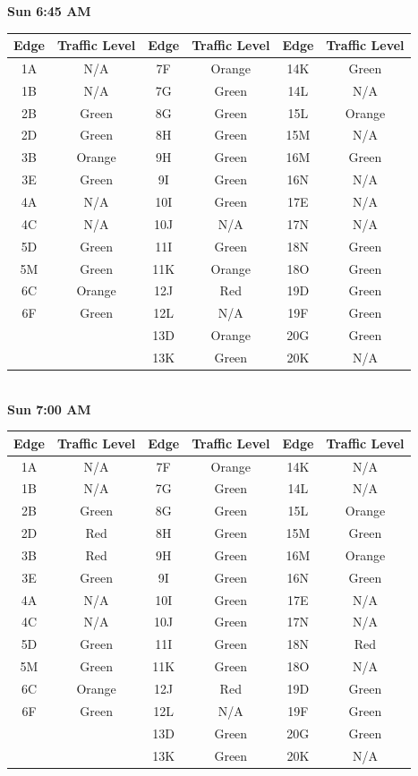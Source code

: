 \documentclass{article}
\begin{document}
\textbf{Sun 6:45 AM} \\

\begin{tabular}{|c|c||c|c||c|c|}\hline
Edge & Traffic Level & Edge & Traffic Level & Edge & Traffic Level \\ \hline
1A & N/A & 7F & Orange & 14K & Green \\ 
1B & N/A & 7G & Green & 14L & N/A \\ \hline
2B & Green & 8G & Green & 15L & Orange \\ 
2D & Green & 8H & Green & 15M & N/A \\ \hline
3B & Orange & 9H & Green & 16M & Green \\ 
3E & Green & 9I & Green & 16N & N/A \\ \hline 
4A & N/A & 10I & Green & 17E & N/A \\ 
4C & N/A & 10J & N/A & 17N & N/A \\ \hline
5D & Green & 11I & Green & 18N & Green \\ 
5M & Green & 11K & Orange & 18O & Green \\ \hline 
6C & Orange & 12J & Red & 19D & Green \\ 
6F & Green & 12L & N/A & 19F & Green \\ \hline 
& & 13D & Orange & 20G & Green \\
& & 13K & Green & 20K & N/A \\ \hline
\end{tabular} \\

\textbf{Sun 7:00 AM} \\

\begin{tabular}{|c|c||c|c||c|c|}\hline
Edge & Traffic Level & Edge & Traffic Level & Edge & Traffic Level \\ \hline
1A & N/A & 7F & Orange & 14K & N/A \\ 
1B & N/A & 7G & Green & 14L & N/A \\ \hline
2B & Green & 8G & Green & 15L & Orange \\ 
2D & Red & 8H & Green & 15M & Green \\ \hline
3B & Red & 9H & Green & 16M & Orange \\ 
3E & Green & 9I & Green & 16N & Green \\ \hline 
4A & N/A & 10I & Green & 17E & N/A \\ 
4C & N/A & 10J & Green & 17N & N/A \\ \hline
5D & Green & 11I & Green & 18N & Red \\ 
5M & Green & 11K & Green & 18O & N/A \\ \hline 
6C & Orange & 12J & Red & 19D & Green \\ 
6F & Green & 12L & N/A & 19F & Green \\ \hline 
& & 13D & Green & 20G & Green \\
& & 13K & Green & 20K & N/A \\ \hline
\end{tabular} \\
\end{document}
